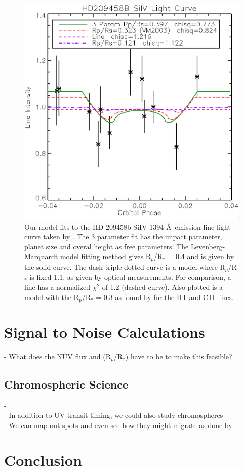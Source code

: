 \documentclass[twocolumn]{emulateapj}
\newcommand{\cii}{\ensuremath{\mathrm{C}\,\scriptstyle \mathrm{II}}}
\newcommand{\hi}{\ensuremath{\mathrm{H}\,\scriptstyle \mathrm{I}}}
\begin{document}
\begin{figure}[!ht]
\includegraphics[width=0.5 \textwidth]{hd209458.eps}
\caption{Our model fits to the HD 209458b SiIV 1394 \AA\ emission line light curve taken by
  \citet{vidmad}. The 3 parameter fit has the impact parameter, planet
  size and overal height as free parameters. The Levenberg-Marquardt
  model fitting method gives R$_p$/R$_*$ = 0.4 and is given by the
  solid curve. The 
  dash-triple dotted curve is a model where R$_p$/R$_*$ is fixed 1.1,
  as given by optical measurements. For comparison, a line has a normalized
  $\chi^2$ of 1.2 (dashed curve). Also plotted is a model with the
  R$_p$/R$_*$ = 0.3 as found by \citet{vidmad} for the \hi\ and
  \cii\ lines.}
\label{fig03}
\end{figure}

\section{Signal to Noise Calculations} \label{labl:sn}
- What does the NUV flux and (R$_p$/R$_*$) have to be to make this feasible?

\subsection{Chromospheric Science} \label{labl:cscience}
- \\
- In addition to UV transit timing, we could also study chromospheres
- \\
- We can map out spots and even see how they might migrate as done by \citet{2010arXiv1002.4113H}

\section{Conclusion}
\end{document}

